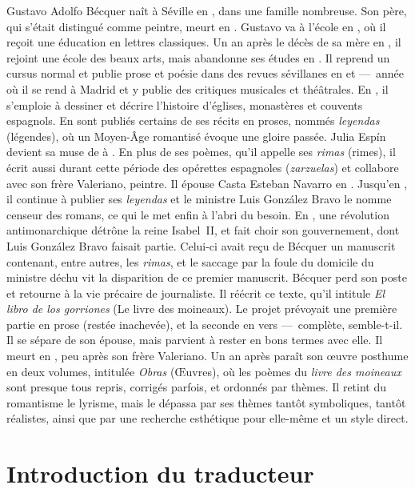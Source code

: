 \documentclass[a4paper,12pt]{book}
\begin{document}
Gustavo Adolfo Bécquer naît à Séville en , dans une
famille nombreuse. Son père, qui s'était distingué comme peintre,
meurt en . Gustavo va à l'école en
, où il reçoit une éducation en lettres
classiques. Un an après le décès de sa mère en , il
rejoint une école des beaux arts, mais abandonne ses études en
. Il reprend un cursus normal et publie prose et
poésie dans des revues sévillanes en  et
 ---~année où il se rend à Madrid et y publie des
critiques musicales et théâtrales. En , il
s'emploie à dessiner et décrire l'histoire d'églises, monastères et
couvents espagnols. En  sont publiés certains de
ses récits en proses, nommés \emph{leyendas} (légendes), où un
Moyen-Âge romantisé évoque une gloire passée. Julia Espín devient sa
muse de  à . En plus de ses
poèmes, qu'il appelle ses \emph{rimas} (rimes), il écrit aussi durant
cette période des opérettes espagnoles (\emph{zarzuelas}) et collabore
avec son frère Valeriano, peintre. Il épouse Casta Esteban Navarro en
. Jusqu'en , il continue à
publier ses \emph{leyendas} et le ministre Luis González Bravo le
nomme censeur des romans, ce qui le met enfin à l'abri du besoin. En
, une révolution antimonarchique détrône la reine
Isabel~II, et fait choir son gouvernement, dont Luis González Bravo
faisait partie. Celui-ci avait reçu de Bécquer un manuscrit contenant,
entre autres, les \emph{rimas}, et le saccage par la foule du domicile
du ministre déchu vit la disparition de ce premier manuscrit. Bécquer
perd son poste et retourne à la vie précaire de journaliste. Il
réécrit ce texte, qu'il intitule \emph{El libro de los gorriones} (Le
livre des moineaux). Le projet prévoyait une première partie en prose
(restée inachevée), et la seconde en vers ---~complète,
semble-t-il. Il se sépare de son épouse, mais parvient à rester en
bons termes avec elle. Il meurt en , peu après son
frère Valeriano. Un an après paraît son œuvre posthume en deux
volumes, intitulée \emph{Obras} (Œuvres), où les poèmes du \emph{livre
des moineaux} sont presque tous repris, corrigés parfois, et ordonnés
par thèmes. Il retint du romantisme le lyrisme, mais le dépassa par
ses thèmes tantôt symboliques, tantôt réalistes, ainsi que par une
recherche esthétique pour elle-même et un style direct.

\chapter{Introduction du traducteur}
\end{document}
